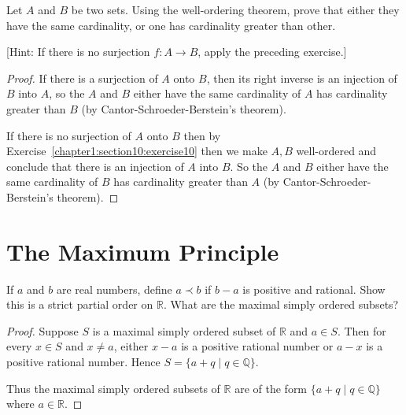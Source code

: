 \begin{exercise}\label{chapter1:section10:exercise11}
    Let $A$ and $B$ be two sets. Using the well-ordering theorem, prove that either they have the same cardinality, or one has cardinality greater than other.

        [Hint: If there is no surjection $f: A\to B$, apply the preceding exercise.]
\end{exercise}

\begin{proof}
    If there is a surjection of $A$ onto $B$, then its right inverse is an injection of $B$ into $A$, so the $A$ and $B$ either have the same cardinality of $A$ has cardinality greater than $B$ (by Cantor-Schroeder-Berstein's theorem).

    If there is no surjection of $A$ onto $B$ then by Exercise~\ref{chapter1:section10:exercise10} then we make $A, B$ well-ordered and conclude that there is an injection of $A$ into $B$. So the $A$ and $B$ either have the same cardinality of $B$ has cardinality greater than $A$ (by Cantor-Schroeder-Berstein's theorem).
\end{proof}

\section{The Maximum Principle}

\begin{exercise}\label{chapter1:section11:exercise1}
    If $a$ and $b$ are real numbers, define $a \prec b$ if $b - a$ is positive and rational. Show this is a strict partial order on $\mathbb{R}$. What are the maximal simply ordered subsets?
\end{exercise}

\begin{proof}
    Suppose $S$ is a maximal simply ordered subset of $\mathbb{R}$ and $a\in S$. Then for every $x\in S$ and $x\ne a$, either $x - a$ is a positive rational number or $a - x$ is a positive rational number. Hence $S = \{ a + q \mid q\in\mathbb{Q} \}$.

    Thus the maximal simply ordered subsets of $\mathbb{R}$ are of the form $\{ a + q \mid q\in\mathbb{Q} \}$ where $a\in\mathbb{R}$.
\end{proof}


